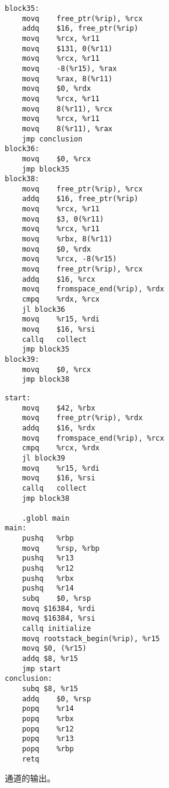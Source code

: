 \documentclass[11pt]{book}
\begin{document}
\begin{figure}[htbp]
\begin{minipage}[t]{0.5\textwidth}
\begin{lstlisting}[basicstyle=\ttfamily\scriptsize]
block35:
	movq	free_ptr(%rip), %rcx
	addq	$16, free_ptr(%rip)
	movq	%rcx, %r11
	movq	$131, 0(%r11)
	movq	%rcx, %r11
	movq	-8(%r15), %rax
	movq	%rax, 8(%r11)
	movq	$0, %rdx
	movq	%rcx, %r11
	movq	8(%r11), %rcx
	movq	%rcx, %r11
	movq	8(%r11), %rax
	jmp conclusion
block36:
	movq	$0, %rcx
	jmp block35
block38:
	movq	free_ptr(%rip), %rcx
	addq	$16, free_ptr(%rip)
	movq	%rcx, %r11
	movq	$3, 0(%r11)
	movq	%rcx, %r11
	movq	%rbx, 8(%r11)
	movq	$0, %rdx
	movq	%rcx, -8(%r15)
	movq	free_ptr(%rip), %rcx
	addq	$16, %rcx
	movq	fromspace_end(%rip), %rdx
	cmpq	%rdx, %rcx
	jl block36
	movq	%r15, %rdi
	movq	$16, %rsi
	callq	collect
	jmp block35
block39:
	movq	$0, %rcx
	jmp block38
\end{lstlisting}
\end{minipage}
\begin{minipage}[t]{0.45\textwidth}
\begin{lstlisting}[basicstyle=\ttfamily\scriptsize]
start:
	movq	$42, %rbx
	movq	free_ptr(%rip), %rdx
	addq	$16, %rdx
	movq	fromspace_end(%rip), %rcx
	cmpq	%rcx, %rdx
	jl block39
	movq	%r15, %rdi
	movq	$16, %rsi
	callq	collect
	jmp block38
        
	.globl main
main:
	pushq	%rbp
	movq	%rsp, %rbp
	pushq	%r13
	pushq	%r12
	pushq	%rbx
	pushq	%r14
	subq	$0, %rsp
	movq $16384, %rdi
	movq $16384, %rsi
	callq initialize
	movq rootstack_begin(%rip), %r15
	movq $0, (%r15)
	addq $8, %r15
	jmp start
conclusion:
	subq $8, %r15
	addq	$0, %rsp
	popq	%r14
	popq	%rbx
	popq	%r12
	popq	%r13
	popq	%rbp
	retq
\end{lstlisting}
\end{minipage}
\caption{  通道的输出。}
\label{fig:print-x86-output-gc}
\end{figure}
\end{document}
